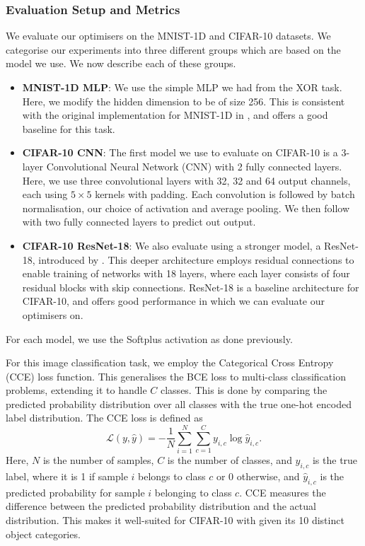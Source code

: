 \subsubsection{Evaluation Setup and Metrics}
We evaluate our optimisers on the MNIST-1D and CIFAR-10 datasets. We categorise our experiments into three different groups which are based on the model we use. We now describe each of these groups.

\begin{itemize}
    \item \textbf{MNIST-1D MLP}: We use the simple MLP we had from the XOR task. Here, we modify the hidden dimension to be of size 256. This is consistent with the original implementation for MNIST-1D in \citep{greydanus_mnist1d}, and offers a good baseline for this task.
    \item \textbf{CIFAR-10 CNN}: The first model we use to evaluate on CIFAR-10 is a 3-layer Convolutional Neural Network (CNN) with 2 fully connected layers. Here, we use three convolutional layers with 32, 32 and 64 output channels, each using $5 \times 5$ kernels with padding. Each convolution is followed by batch normalisation, our choice of activation and average pooling. We then follow with two fully connected layers to predict out output.
    \item \textbf{CIFAR-10 ResNet-18}: We also evaluate using a stronger model, a ResNet-18, introduced by \citep{resnet}. This deeper architecture employs residual connections to enable training of networks with 18 layers, where each layer consists of four residual blocks with skip connections. ResNet-18 is a baseline architecture for CIFAR-10, and offers good performance in which we can evaluate our optimisers on. 
\end{itemize}
For each model, we use the Softplus activation as done previously. 

For this image classification task, we employ the Categorical Cross Entropy (CCE) loss function. This generalises the BCE loss to multi-class classification problems, extending it to handle $C$ classes. This is done by comparing the predicted probability distribution over all classes with the true one-hot encoded label distribution. The CCE loss is defined as
\begin{equation}
\mathcal{L}(y, \hat{y}) = -\frac{1}{N} \sum_{i=1}^N \sum_{c=1}^C y_{i,c} \log \hat{y}_{i,c}.
\end{equation}
Here, $N$ is the number of samples, $C$ is the number of classes, and $y_{i,c}$ is the true label, where it is 1 if sample $i$ belongs to class $c$ or 0 otherwise, and $\hat{y}_{i,c}$ is the predicted probability for sample $i$ belonging to class $c$. CCE measures the difference between the predicted probability distribution and the actual distribution. This makes it well-suited for CIFAR-10 with given its 10 distinct object categories.


